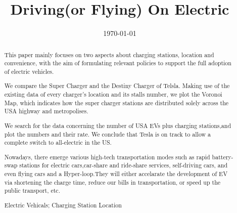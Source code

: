 \documentclass{mcmthesis}
\title{Driving(or Flying) On Electric}
\date{\today}
\begin{document}
\begin{abstract}

This paper mainly focuses on two aspects about charging stations, location and convenience, with the aim of formulating relevant policies to support the full adoption of electric vehicles.

We compare the Super Charger and the Destiny Charger of Telsla. Making use of the existing data of every charger's location and its stalls number, we plot the Voronoi Map, which indicates how the super charger stations are distributed solely across the USA highway and metropolises.

We search for the data concerning the number of USA EVs plus charging stations,and plot the numbers and their rate. We conclude that Tesla is on track to allow a complete switch to all-electric in the US.

Nowadays, there emerge various high-tech transportation modes such as rapid battery-swap stations for electric cars,car-share and ride-share services, self-driving cars, and even flying cars and a Hyper-loop.They will either accelarate the development of EV via shortening the charge time, reduce our bills in transportation, or speed up the public transport, etc. 


%
%
%
%

\begin{keywords}
Electric Vehicals;  Charging Station Location
\end{keywords}

\end{abstract}
\end{document}
